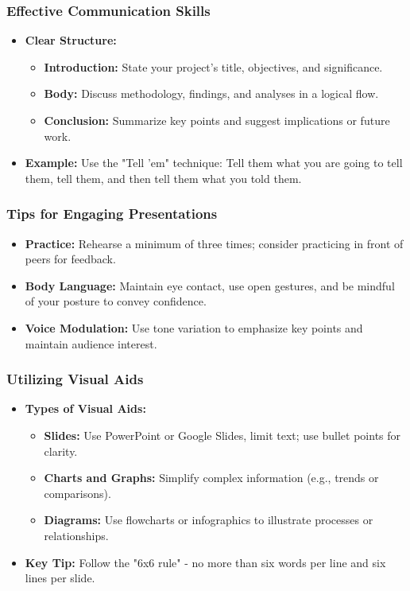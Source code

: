\documentclass[aspectratio=169]{beamer}
\begin{document}
\begin{frame}[fragile]
    \frametitle{Effective Communication Skills}
    \begin{itemize}
        \item \textbf{Clear Structure:}
        \begin{itemize}
            \item \textbf{Introduction:} State your project's title, objectives, and significance.
            \item \textbf{Body:} Discuss methodology, findings, and analyses in a logical flow.
            \item \textbf{Conclusion:} Summarize key points and suggest implications or future work.
        \end{itemize}
        \item \textbf{Example:} Use the "Tell 'em" technique: Tell them what you are going to tell them, tell them, and then tell them what you told them.
    \end{itemize}
\end{frame}

\begin{frame}[fragile]
    \frametitle{Tips for Engaging Presentations}
    \begin{itemize}
        \item \textbf{Practice:} Rehearse a minimum of three times; consider practicing in front of peers for feedback.
        \item \textbf{Body Language:} Maintain eye contact, use open gestures, and be mindful of your posture to convey confidence.
        \item \textbf{Voice Modulation:} Use tone variation to emphasize key points and maintain audience interest.
    \end{itemize}
\end{frame}

\begin{frame}[fragile]
    \frametitle{Utilizing Visual Aids}
    \begin{itemize}
        \item \textbf{Types of Visual Aids:}
        \begin{itemize}
            \item \textbf{Slides:} Use PowerPoint or Google Slides, limit text; use bullet points for clarity.
            \item \textbf{Charts and Graphs:} Simplify complex information (e.g., trends or comparisons).
            \item \textbf{Diagrams:} Use flowcharts or infographics to illustrate processes or relationships.
        \end{itemize}
        \item \textbf{Key Tip:} Follow the "6x6 rule" - no more than six words per line and six lines per slide.
    \end{itemize}
\end{frame}
\end{document}

